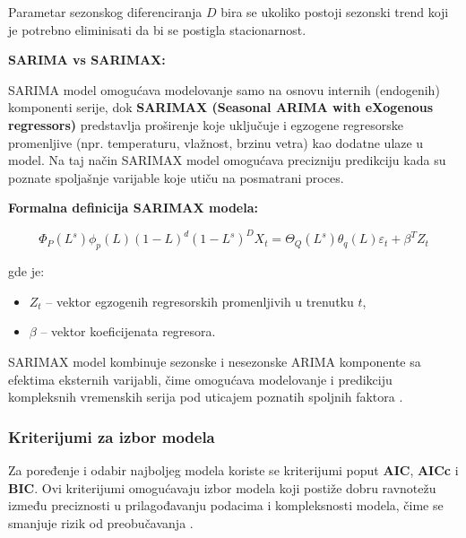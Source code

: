 \documentclass[12pt]{article}
\begin{document}
Parametar sezonskog diferenciranja $D$ bira se ukoliko postoji sezonski trend koji je potrebno eliminisati da bi se postigla stacionarnost.

\textbf{SARIMA vs SARIMAX:}

SARIMA model omogućava modelovanje samo na osnovu internih (endogenih) komponenti serije, dok \textbf{SARIMAX (Seasonal ARIMA with eXogenous regressors)} predstavlja proširenje koje uključuje i egzogene regresorske promenljive (npr. temperaturu, vlažnost, brzinu vetra) kao dodatne ulaze u model. Na taj način SARIMAX model omogućava precizniju predikciju kada su poznate spoljašnje varijable koje utiču na posmatrani proces.

\textbf{Formalna definicija SARIMAX modela:}

\begin{equation}
\Phi_P (L^s) \phi_p (L) (1 - L)^d (1 - L^s)^D X_t
= \Theta_Q (L^s) \theta_q (L) \varepsilon_t + \beta^T Z_t
\end{equation}

gde je:
\begin{itemize}
    \item $Z_t$ -- vektor egzogenih regresorskih promenljivih u trenutku $t$,
    \item $\beta$ -- vektor koeficijenata regresora.
\end{itemize}

SARIMAX model kombinuje sezonske i nesezonske ARIMA komponente sa efektima eksternih varijabli, čime omogućava modelovanje i predikciju kompleksnih vremenskih serija pod uticajem poznatih spoljnih faktora \cite{box1970, brockwell2002}.


\subsubsection{Kriterijumi za izbor modela}

Za poređenje i odabir najboljeg modela koriste se kriterijumi poput \textbf{AIC}, \textbf{AICc} i \textbf{BIC}. Ovi kriterijumi omogućavaju izbor modela koji postiže dobru ravnotežu između preciznosti u prilagođavanju podacima i kompleksnosti modela, čime se smanjuje rizik od preobučavanja \cite{burnham2002}.
\end{document}
